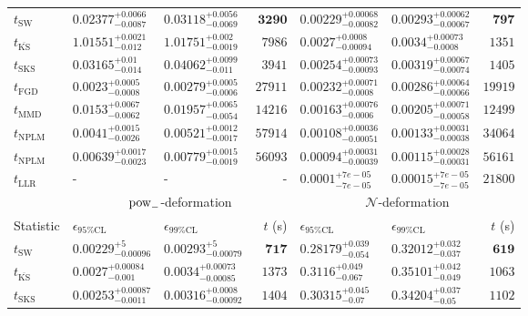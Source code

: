\begin{tabular}{l|llr|llr}
	\midrule
	$t_{\mathrm{SW}}$ & $0.02377_{-0.0087}^{+0.0066}$ & $0.03118_{-0.0069}^{+0.0056}$ & ${\mathbf{3290}}$ & $0.00229_{-0.00082}^{+0.00068}$ & $0.00293_{-0.00067}^{+0.00062}$ & ${\mathbf{797}}$ \\
	$t_{\overline{\mathrm{KS}}}$ & $1.01551_{-0.012}^{+0.0021}$ & $1.01751_{-0.0019}^{+0.002}$ & $7986$ & $0.0027_{-0.00094}^{+0.0008}$ & $0.0034_{-0.0008}^{+0.00073}$ & $1351$ \\
	$t_{\mathrm{SKS}}$ & $0.03165_{-0.014}^{+0.01}$ & $0.04062_{-0.011}^{+0.0099}$ & $3941$ & $0.00254_{-0.00093}^{+0.00073}$ & $0.00319_{-0.00074}^{+0.00067}$ & $1405$ \\
	$t_{\mathrm{FGD}}$ & ${\mathbf{0.0023_{-0.0008}^{+0.0005}}}$ & ${\mathbf{0.00279_{-0.0006}^{+0.0005}}}$ & $27911$ & $0.00232_{-0.0008}^{+0.00071}$ & $0.00286_{-0.00066}^{+0.00064}$ & $19919$ \\
	$t_{\mathrm{MMD}}$ & $0.0153_{-0.0062}^{+0.0067}$ & $0.01957_{-0.0054}^{+0.0065}$ & $14216$ & ${\mathbf{0.00163_{-0.0006}^{+0.00076}}}$ & ${\mathbf{0.00205_{-0.00058}^{+0.00071}}}$ & $12499$ \\
\rowcolor{red!35}	$t_{\mathrm{NPLM}}$ & $0.0041_{-0.0026}^{+0.0015}$ & $0.00521_{-0.0017}^{+0.0012}$ & $57914$ & $0.00108_{-0.00051}^{+0.00036}$ & $0.00133_{-0.00038}^{+0.00031}$ & $34064$ \\
\rowcolor{blue!35}	$t_{\mathrm{NPLM}}$ & $0.00639_{-0.0023}^{+0.0017}$ & $0.00779_{-0.0019}^{+0.0015}$ & $56093$ & $0.00094_{-0.00039}^{+0.00031}$ & $0.00115_{-0.00031}^{+0.00028}$ & $56161$ \\
	$t_{\mathrm{LLR}}$ & - & - & - & $0.0001_{-7e-05}^{+7e-05}$ & $0.00015_{-7e-05}^{+7e-05}$ & $21800$ \\
	\toprule
	\multicolumn{1}{c}{} & \multicolumn{3}{c}{$\rm{pow}_{-}$-deformation} & \multicolumn{3}{c}{$\mathcal{N}$-deformation} \\
	Statistic & $\epsilon_{95\%\mathrm{CL}}$ & $\epsilon_{99\%\mathrm{CL}}$ & $t$ (s) & $\epsilon_{95\%\mathrm{CL}}$ & $\epsilon_{99\%\mathrm{CL}}$ & $t$ (s) \\
	\midrule
	$t_{\mathrm{SW}}$ & $0.00229_{-0.00096}^{+5}$ & $0.00293_{-0.00079}^{+5}$ & ${\mathbf{717}}$ & $0.28179_{-0.054}^{+0.039}$ & $0.32012_{-0.037}^{+0.032}$ & ${\mathbf{619}}$ \\
	$t_{\overline{\mathrm{KS}}}$ & $0.0027_{-0.001}^{+0.00084}$ & $0.0034_{-0.00085}^{+0.00073}$ & $1373$ & $0.3116_{-0.067}^{+0.049}$ & $0.35101_{-0.049}^{+0.042}$ & $1063$ \\
	$t_{\mathrm{SKS}}$ & $0.00253_{-0.0011}^{+0.00087}$ & $0.00316_{-0.00092}^{+0.0008}$ & $1404$ & $0.30315_{-0.07}^{+0.045}$ & $0.34204_{-0.05}^{+0.037}$ & $1102$ \\

\end{tabular}
